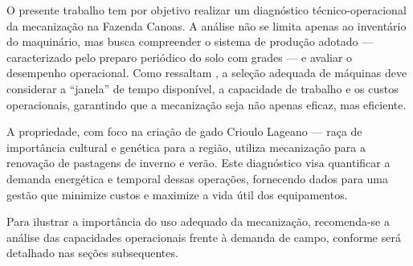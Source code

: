 \documentclass[12pt,openright,oneside,a4paper,hidelinks,espacamento=1.5]{abntex2}
\begin{document}
O presente trabalho tem por objetivo realizar um diagnóstico técnico-operacional da mecanização na Fazenda Canoas. A análise não se limita apenas ao inventário do maquinário, mas busca compreender o sistema de produção adotado — caracterizado pelo preparo periódico do solo com grades — e avaliar o desempenho operacional. Como ressaltam , a seleção adequada de máquinas deve considerar a ``janela'' de tempo disponível, a capacidade de trabalho e os custos operacionais, garantindo que a mecanização seja não apenas eficaz, mas eficiente.

A propriedade, com foco na criação de gado Crioulo Lageano — raça de importância cultural e genética para a região, utiliza mecanização para a renovação de pastagens de inverno e verão. Este diagnóstico visa quantificar a demanda energética e temporal dessas operações, fornecendo dados para uma gestão que minimize custos e maximize a vida útil dos equipamentos.

Para ilustrar a importância do uso adequado da mecanização, recomenda-se a análise das capacidades operacionais frente à demanda de campo, conforme será detalhado nas seções subsequentes.


%
\end{document}
